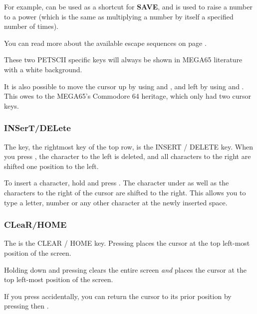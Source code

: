 For example, \megakeywhite{$\leftarrow$} can be used as a shortcut for {\bf SAVE}, and \megakeywhite{$\uparrow$} is used to raise a number to a power (which is the same as multiplying a number by itself a specified number of times).

You can read more about the available escape sequences on page \pageref{escape-sequences}.

These two PETSCII specific keys will always be shown in MEGA65 literature with a white background.

It is also possible to move the cursor up by using  and \megakey{$\downarrow$}, and left by using  and \megakey{$\rightarrow$}. This owes to the MEGA65's Commodore 64 heritage, which only had two cursor keys.

\subsubsection{INSerT/DELete}
The  key, the rightmost key of the top row, is the INSERT / DELETE key. When you press , the character to the left is deleted, and all characters to the right are shifted one position to the left.

To insert a character, hold  and press . The character under as well as the characters to the right of the cursor are shifted to the right. This allows you to type a letter, number or any other character at the newly inserted space.


\subsubsection{CLeaR/HOME}
The  is the CLEAR / HOME key. Pressing  places the cursor at the top left-most position of the screen.

Holding down  and pressing  clears the entire screen {\it and} places the cursor at the top left-most position of the screen.

If you press  accidentally, you can return the cursor to its prior position by pressing  then .


